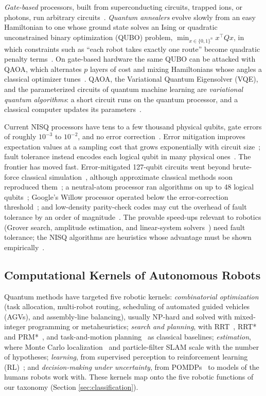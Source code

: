 \documentclass[acmsmall,screen,review]{acmart}
\begin{document}
\emph{Gate-based} processors, built from superconducting circuits, trapped ions, or photons, run arbitrary circuits~\cite{Kjaergaard2020}. \emph{Quantum annealers} evolve slowly from an easy Hamiltonian to one whose ground state solves an Ising or quadratic unconstrained binary optimization (QUBO) problem, $\min_{x\in\{0,1\}^n} x^{\top}Qx$, in which constraints such as ``each robot takes exactly one route'' become quadratic penalty terms~\cite{Johnson2011,Lucas2014}. On gate-based hardware the same QUBO can be attacked with QAOA, which alternates $p$ layers of cost and mixing Hamiltonians whose angles a classical optimizer tunes~\cite{Farhi2014}. QAOA, the Variational Quantum Eigensolver (VQE), and the parameterized circuits of quantum machine learning are \emph{variational quantum algorithms}: a short circuit runs on the quantum processor, and a classical computer updates its parameters~\cite{Peruzzo2014,McClean2016,Cerezo2021a,Bharti2022}.

Current NISQ processors have tens to a few thousand physical qubits, gate errors of roughly $10^{-3}$ to $10^{-2}$, and no error correction~\cite{Preskill2018}. Error mitigation improves expectation values at a sampling cost that grows exponentially with circuit size~\cite{Temme2017,Kandala2019,Cai2023}; fault tolerance instead encodes each logical qubit in many physical ones~\cite{Terhal2015,Fowler2012}. The frontier has moved fast. Error-mitigated 127-qubit circuits went beyond brute-force classical simulation~\cite{KimY2023}, although approximate classical methods soon reproduced them~\cite{Begusic2024}; a neutral-atom processor ran algorithms on up to 48 logical qubits~\cite{Bluvstein2024}; Google's Willow processor operated below the error-correction threshold~\cite{GoogleQAI2025}; and low-density parity-check codes may cut the overhead of fault tolerance by an order of magnitude~\cite{Bravyi2024}. The provable speed-ups relevant to robotics (Grover search, amplitude estimation, and linear-system solvers~\cite{Harrow2009}) need fault tolerance; the NISQ algorithms are heuristics whose advantage must be shown empirically~\cite{Montanaro2016}.

\subsection{Computational Kernels of Autonomous Robots}\label{sec:kernels}
Quantum methods have targeted five robotic kernels: \emph{combinatorial optimization} (task allocation, multi-robot routing, scheduling of automated guided vehicles (AGVs), and assembly-line balancing), usually NP-hard and solved with mixed-integer programming or metaheuristics; \emph{search and planning}, with RRT~\cite{LaValle1998}, RRT* and PRM*~\cite{Karaman2011}, and task-and-motion planning~\cite{Garrett2021} as classical baselines; \emph{estimation}, where Monte Carlo localization~\cite{Dellaert1999} and particle-filter SLAM scale with the number of hypotheses; \emph{learning}, from supervised perception to reinforcement learning (RL)~\cite{Sutton2018,Kober2013}; and \emph{decision-making under uncertainty}, from POMDPs~\cite{Kaelbling1998,Kurniawati2022} to models of the humans robots work with. These kernels map onto the five robotic functions of our taxonomy (Section \ref{sec:classification}).
\end{document}
